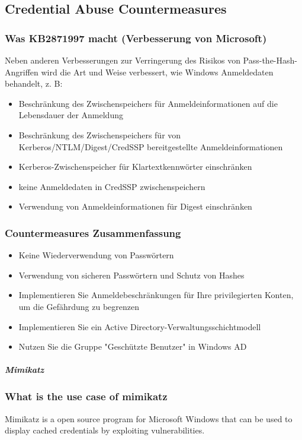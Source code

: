 \subsection{Credential Abuse Countermeasures}
\subsubsection{Was KB2871997 macht (Verbesserung von Microsoft)}
Neben anderen Verbesserungen zur Verringerung des Risikos von Pass-the-Hash-Angriffen wird die Art und Weise verbessert, wie Windows Anmeldedaten behandelt, z. B:
\begin{itemize}
    \item Beschränkung des Zwischenspeichers für Anmeldeinformationen auf die Lebensdauer der Anmeldung
    \item Beschränkung des Zwischenspeichers für von Kerberos/NTLM/Digest/CredSSP bereitgestellte Anmeldeinformationen
    \item Kerberos-Zwischenspeicher für Klartextkennwörter einschränken
    \item keine Anmeldedaten in CredSSP zwischenspeichern
    \item Verwendung von Anmeldeinformationen für Digest einschränken
\end{itemize}

\subsubsection{Countermeasures Zusammenfassung}
\begin{itemize}
    \item Keine Wiederverwendung von Passwörtern
    \item Verwendung von sicheren Passwörtern und Schutz von Hashes
    \item Implementieren Sie Anmeldebeschränkungen für Ihre privilegierten Konten, um die Gefährdung zu begrenzen
    \item Implementieren Sie ein Active Directory-Verwaltungsschichtmodell
    \item Nutzen Sie die Gruppe "Geschützte Benutzer" in Windows AD
\end{itemize}


\subparagraph{Mimikatz}
\subsubsection{What is the use case of mimikatz}
Mimikatz is a open source program for Microsoft Windows that can be used to display cached credentials by exploiting vulnerabilities.

